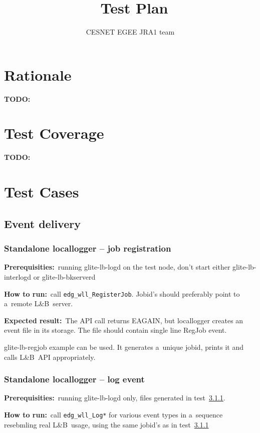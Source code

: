 \documentclass{egee}
\title{\LB\ Test Plan}
\author{CESNET EGEE JRA1 team}
\def\LB{L\&B}
\def\req{\noindent\textbf{Prerequisities:}}
\def\how{\noindent\textbf{How to run:}}
\def\result{\noindent\textbf{Expected result:}}
\def\path#1{{\normalfont\textsf{#1}}}
\def\code#1{\texttt{#1}}
\def\todo#1{\textbf{TODO:} #1}
\begin{document}

\newpage
\tableofcontents
\newpage

\section{Rationale}
\todo{}

\section{Test Coverage}
\todo{}

\section{Test Cases}

\subsection{Event delivery}

\subsubsection{Standalone locallogger -- job registration}
\label{reg}
\req\ running \path{glite-lb-logd} on the test node, don't start either
\path{glite-lb-interlogd} or \path{glite-lb-bkserverd}

\how\ call \code{edg\_wll\_RegisterJob}. Jobid's should preferably point
to a~remote \LB\ server.

\result\ The API call returns EAGAIN, but locallogger creates an event file
in its storage.
The file should contain single line RegJob event.

\begin{hints}
\path{glite-lb-regjob} example can be used. It generates a~unique jobid,
prints it and calls \LB\ API appropriately.
\end{hints}

\subsubsection{Standalone locallogger -- log event}
\label{log}
\req\ running \path{glite-lb-logd} only, files generated in test~\ref{reg}.

\how\ call \code{edg\_wll\_Log*} for various event types in a~sequence
resebmling real \LB\ usage, using the same jobid's as in test~\ref{reg}
\end{document}
